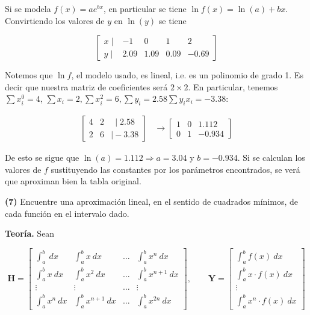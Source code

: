 \documentclass[12pt]{article}
\begin{document}
Si se modela $f(x) = a e^{bx}$, en particular se tiene $\ln f(x) = \ln(a) + bx$.
Convirtiendo los valores de $y$ en $\ln(y)$ se tiene 

\begin{equation*}
    \begin{bmatrix} 
        x \mid & -1 & 0 & 1 & 2 \\ 
        y\mid & 2.09 & 1.09 & 0.09 & -0.69
    \end{bmatrix} 
\end{equation*}

Notemos que $\ln f$, el modelo usado, es lineal, i.e. es un polinomio de grado
1. Es decir que nuestra matriz de coeficientes será $2 \times 2$. En particular,
tenemos $\sum x_i^0 = 4$, $\sum x_i = 2, \sum x_i^2 = 6, \sum y_i = 2.58 \sum
y_i x_i = -3.38$: 


\begin{align*}
    \begin{bmatrix} 
    4 & 2 & ~ \mid 2.58 \\ 
    2 & 6 &  \mid -3.38
\end{bmatrix} &\to \begin{bmatrix} 
1 & 0 & 1.112 \\ 
0 & 1 & -0.934
\end{bmatrix} 
\end{align*}

De esto se sigue que $\ln(a) = 1.112 \Rightarrow a = 3.04$ y $b = -0.934$. Si se calculan 
los valores de $f$ sustituyendo las constantes por los parámetros encontrados,
se verá que aproximan bien la tabla original.


\pagebreak 

\begin{myframe}
    \textbf{(7)} Encuentre una aproximación lineal, en el sentido de cuadrados
    mínimos, de cada función en el intervalo dado.
\end{myframe}

\textbf{Teoría.} Sean

\begin{equation*}
    \textbf{H} = \begin{bmatrix} 
        \int_a^b ~ dx & \int_a^b x ~ dx & \ldots & \int_a^b x^n ~ dx \\ 
        \int_a^b x ~ dx & \int_a^b x^2 ~ dx & \ldots & \int_a^b x^{n+1} ~ dx \\ 
        \vdots & \vdots & \ldots & \vdots \\ 
        \int_a^b x^n ~ dx & \int_a^b x^{n+1} ~ dx & \ldots & \int_a^b x^{2n} ~
        dx
    \end{bmatrix}, \qquad
    \textbf{Y} = \begin{bmatrix} 
        \int_a^b f(x) ~ dx \\
        \int_a^b x \cdot f(x) ~ dx \\
        \vdots  \\
            \int_a^b x^n \cdot f(x) ~ dx
    \end{bmatrix}
\end{equation*}
\end{document}
